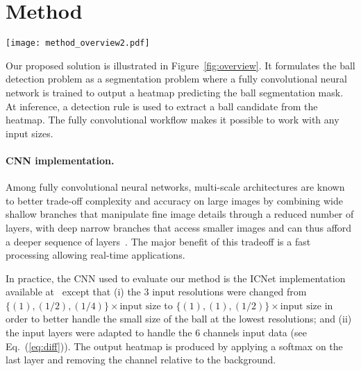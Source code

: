 \documentclass[sigconf, screen]{acmart}
\begin{document}
\section{Method}
\label{sec:model}


\begin{figure*}
    \begin{center}
    \texttt{[image: method\_overview2.pdf]}
    \end{center}
    \vspace{-1em}
    \caption{
    Our detector is based on a segmentation task performed by a fully convolutional network that outputs a heatmap of the ball position. At inference, a detection rule is used to predict the ball location from the heatmap.}
    \label{fig:overview}
\end{figure*}


Our proposed solution is illustrated in Figure~\ref{fig:overview}. It formulates the ball detection problem as a segmentation problem
where a fully convolutional neural network is trained to output a heatmap predicting the ball segmentation mask.
At inference, a detection rule is used to extract a ball candidate from the heatmap.
The fully convolutional workflow makes it possible to work with any input sizes.


\paragraph{CNN implementation.}
Among fully convolutional neural networks, multi-scale architectures are known to better trade-off complexity and accuracy on large images by combining wide shallow branches that manipulate fine image details through a reduced number of layers, with deep narrow branches that access smaller images and can thus afford a deeper sequence of layers~\cite{Yu2018,Mazzini2019,Poudel2019,Zhao2018}. The major benefit of this tradeoff is a fast processing allowing real-time applications.

In practice, the CNN used to evaluate our method is the ICNet implementation available at~\cite{hellochick} except that (i) the 3 input resolutions were changed from {\footnotesize $\{(1),(1/2),(1/4)\}\times\text{input size}$} to {\footnotesize $\{(1),(1),(1/2)\}\times\text{input size}$} in order to better handle the small size of the ball at the lowest resolutions; and (ii) the input layers were adapted to handle the 6 channels input data (see Eq.~(\ref{eq:diff})). The output heatmap is produced by applying a softmax on the last layer and removing the channel relative to the background.
\end{document}

